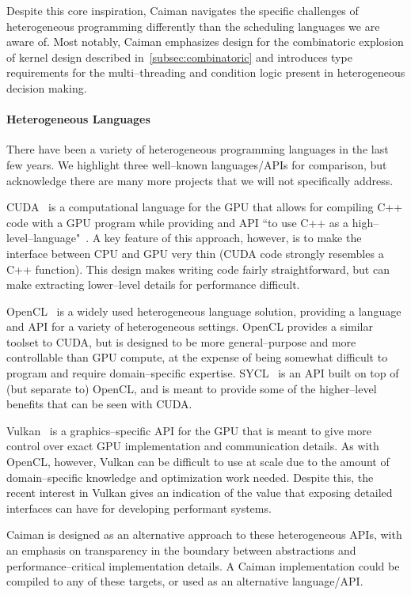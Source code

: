 Despite this core inspiration, Caiman navigates the specific challenges of heterogeneous programming differently than the scheduling languages we are aware of.   Most notably, Caiman emphasizes design for the combinatoric explosion of kernel design described in~\ref{subsec:combinatoric} and introduces type requirements for the multi--threading and condition logic present in heterogeneous decision making.

\paragraph{Heterogeneous Languages}

There have been a variety of heterogeneous programming languages in the last few years.  We highlight three well--known languages/APIs for comparison, but acknowledge there are many more projects that we will not specifically address.

CUDA~\cite{cuda} is a computational language for the GPU that allows for compiling C++ code with a GPU program while providing and API ``to use C++ as a high--level--language"~\cite{cudaguide}.  A key feature of this approach, however, is to make the interface between CPU and GPU very thin (CUDA code strongly resembles a C++ function).  This design makes writing code fairly straightforward, but can make extracting lower--level details for performance difficult.

OpenCL~\cite{opencl} is a widely used heterogeneous language solution, providing a language and API for a variety of heterogeneous settings.  OpenCL provides a similar toolset to CUDA, but is designed to be more general--purpose and more controllable than GPU compute, at the expense of being somewhat difficult to program and require domain--specific expertise.  SYCL~\cite{sycl} is an API built on top of (but separate to) OpenCL, and is meant to provide some of the higher--level benefits that can be seen with CUDA.

Vulkan~\cite{vulkan} is a graphics--specific API for the GPU that is meant to give more control over exact GPU implementation and communication details.  As with OpenCL, however, Vulkan can be difficult to use at scale due to the amount of domain--specific knowledge and optimization work needed.  Despite this, the recent interest in Vulkan gives an indication of the value that exposing detailed interfaces can have for developing performant systems.

Caiman is designed as an alternative approach to these heterogeneous APIs, with an emphasis on transparency in the boundary between abstractions and performance--critical implementation details.  A Caiman implementation could be compiled to any of these targets, or used as an alternative language/API.

